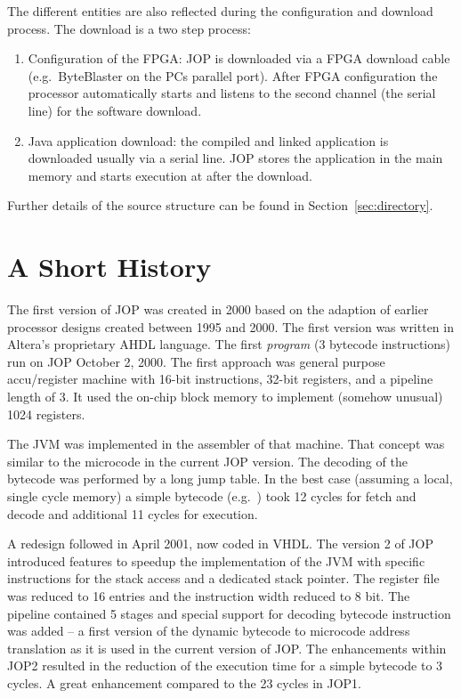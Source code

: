 The different entities are also reflected during the configuration
and download process. The download is a two step process:
\begin{enumerate}
    \item Configuration of the FPGA: JOP is downloaded via a
    FPGA download cable (e.g.\ ByteBlaster on the PCs parallel
    port). After FPGA configuration the processor automatically starts and
    listens to the second channel (the serial line) for the software download.
    \item Java application download: the compiled and linked
    application is downloaded usually via a serial line. JOP stores
    the application in the main memory and starts execution at
     after the download.
\end{enumerate}

Further details of the source structure can be found in
Section~\ref{sec:directory}.

\section{A Short History}

The first version of JOP was created in 2000 based on the adaption
of earlier processor designs created between 1995 and 2000. The
first version was written in Altera's proprietary AHDL language. The
first \emph{program} (3 bytecode instructions) run on JOP October 2,
2000. The first approach was general purpose accu/register machine
with 16-bit instructions, 32-bit registers, and a pipeline length of
3. It used the on-chip block memory to implement (somehow unusual)
1024 registers.

The JVM was implemented in the assembler of that machine. That
concept was similar to the microcode in the current JOP version. The
decoding of the bytecode was performed by a long jump table. In the
best case (assuming a local, single cycle memory) a simple bytecode
(e.g.\ ) took 12 cycles for fetch and decode and
additional 11 cycles for execution.


A redesign followed in April 2001, now coded in VHDL. The version 2
of JOP introduced features to speedup the implementation of the JVM
with specific instructions for the stack access and a dedicated
stack pointer. The register file was reduced to 16 entries and the
instruction width reduced to 8 bit. The pipeline contained 5 stages
and special support for decoding bytecode instruction was added -- a
first version of the dynamic bytecode to microcode address
translation as it is used in the current version of JOP. The
enhancements within JOP2 resulted in the reduction of the execution
time for a simple bytecode to 3 cycles. A great enhancement compared
to the 23 cycles in JOP1.

